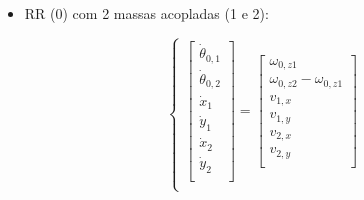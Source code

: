 \begin{itemize}
\item RR (0) com 2 massas acopladas (1 e 2):

\begin{equation}
\begin{cases}

\begin{bmatrix}
\dot{\theta}_{0,1} \\
\dot{\theta}_{0,2} \\
\dot{x}_1 \\
\dot{y}_1 \\
\dot{x}_2 \\
\dot{y}_2 \\
\end{bmatrix}
=
\begin{bmatrix}
\omega_{0,z1} \\
\omega_{0,z2}-\omega_{0,z1} \\
v_{1,x} \\
v_{1,y} \\
v_{2,x} \\
v_{2,y} \\
\end{bmatrix} \\


\end{cases}
\end{equation}
\end{itemize}
